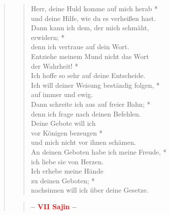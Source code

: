 \begin{quote}
\begin{verse}
Herr, deine Huld komme auf mich herab *\\
und deine Hilfe, wie du es verheißen hast.\\ 
\vin Dann kann ich dem, der mich schmäht,\\ 
\vin erwidern; *\\ 
\vin denn ich vertraue auf dein Wort.\\
Entziehe meinem Mund nicht das Wort\\
der Wahrheit! *\\
Ich hoffe so sehr auf deine Entscheide.\\ 
\vin Ich will deiner Weisung beständig folgen, *\\ 
\vin auf immer und ewig.\\
Dann schreite ich aus auf freier Bahn; *\\
denn ich frage nach deinen Befehlen.\\ 
\vin Deine Gebote will ich\\ 
\vin vor Königen bezeugen *\\ 
\vin und mich nicht vor ihnen schämen.\\ 
An deinen Geboten habe ich meine Freude, *\\
ich liebe sie von Herzen.\\ 
\vin Ich erhebe meine Hände\\ 
\vin zu deinen Geboten; *\\ 
\vin nachsinnen will ich über deine Gesetze.\\ 

\end{verse}

\begin{verse}
 
\begin{center}
 \textcolor{red}{\normalsize\bf – VII Sajin –}\\
\end{center} 


\end{verse}
\end{quote}
